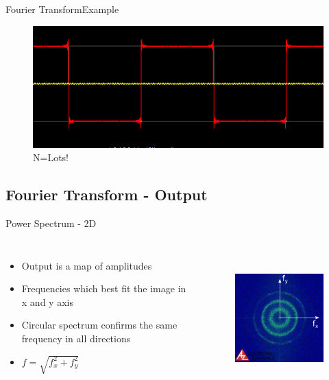 \documentclass{beamer}
\begin{document}
\begin{frame}{Fourier Transform}{Example}
\begin{figure}
\includegraphics[scale=0.75]{images/image23.png}
\caption{N=Lots!}
\end{figure}
\end{frame}

\subsection{Fourier Transform -  Output}
\begin{frame}{Power Spectrum - 2D}
\begin{columns}
		\begin{itemize}
			\item
			Output is a map of amplitudes
			\item
			Frequencies which best fit the image in x and y axis
			\item
			Circular spectrum confirms the same frequency in all directions
			\item
			\begin{math}
				f = \sqrt{f_{x}^2 + f_{y}^2}
			\end{math}
		\end{itemize} 
		\begin{figure}
			\includegraphics[height=150pt]{images/Fourier-output-axes.png}
		\end{figure}
\end{columns}

\end{frame}
\end{document}
